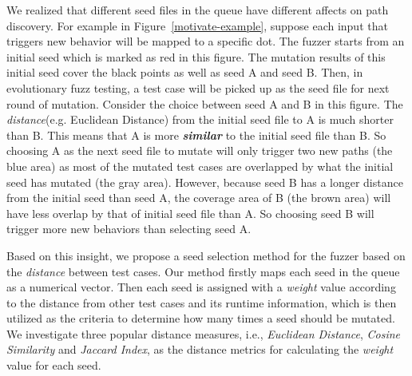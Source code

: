 \documentclass{cta-author}
\begin{document}
We realized that different seed files in the queue have different affects 
on path discovery. For example in Figure~\ref{motivate-example}, suppose 
each input that triggers new behavior will be mapped to a specific dot. 
The fuzzer starts from an initial seed which is marked as red in this figure. 
The mutation results of this initial seed cover the black points 
as well as seed A and seed B. Then, in evolutionary fuzz testing, a 
test case will be picked up as the seed file for next round of mutation. 
Consider the choice between seed A and B in this figure.
The \emph{distance}(e.g. Euclidean Distance) from the initial seed file 
to A is much shorter than B. 
This means that A is more \textbf{\textit{similar}} to the initial seed 
file than B. So choosing A as the next seed file to mutate will only 
trigger two new paths (the blue area) as most of the mutated test cases 
are overlapped by what the initial seed has mutated (the gray area). 
However, because seed B has a longer distance from the initial seed than 
seed A, the coverage area of B (the brown area) will have less overlap 
by that of initial seed file than A. So choosing seed B will trigger 
more new behaviors than selecting seed A.

Based on this insight, we propose a seed selection method for the fuzzer 
based on the \textit{distance} between test cases.
Our method firstly maps each seed in the queue as a numerical vector. 
Then each seed is assigned with a \emph{weight} value according to the 
distance from other test cases and its runtime information, which is 
then utilized as the criteria to determine how many times a seed should
be mutated. 
We investigate three popular distance measures, i.e., \textit{Euclidean Distance}, 
\textit{Cosine Similarity} and \textit{Jaccard Index}, as the distance metrics 
for calculating the \textit{weight} value for each seed. 
\end{document}
